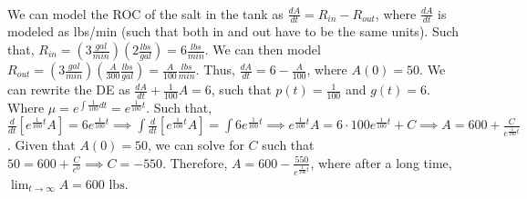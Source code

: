 \documentclass{article}
\begin{document}
\sol \\
We can model the ROC of the salt in the tank as $\frac{dA}{dt} = R_{in} - R_{out}$,
where $\frac{dA}{dt}$ is modeled as lbs/min (such that both in and out have to be the same units).
Such that, $R_{in} = (3 \frac{gal}{min})(2 \frac{lbs}{gal}) = 6 \frac{lbs}{min}$.
We can then model $R_{out} = (3 \frac{gal}{min})(\frac{A}{300} \frac{lbs}{gal}) = \frac{A}{100} \frac{lbs}{min}$.
Thus, $\frac{dA}{dt} = 6 - \frac{A}{100}$, where $A(0) = 50$.
We can rewrite the DE as $\frac{dA}{dt} + \frac{1}{100}A = 6$, such that $p(t) = \frac{1}{100}$ and $g(t) = 6$.
Where $\mu = e^{\int \frac{1}{100} dt} = e^{\frac{1}{100}t}$.
Such that, $\frac{d}{dt} [e^{\frac{1}{100}t}A] = 6e^{\frac{1}{100}t} \implies \int \frac{d}{dt} [e^{\frac{1}{100}t}A] = \int 6e^{\frac{1}{100}t}
\implies e^{\frac{1}{100}t} A = 6 \cdot 100 e^{\frac{1}{100}t} + C \implies A = 600 + \frac{C}{e^{\frac{1}{100}t}}$.
Given that $A(0) = 50$, we can solve for $C$ such that $50 = 600 + \frac{C}{e^0} \implies C = -550$.
Therefore, $A=600-\frac{550}{e^{\frac{1}{100}t}}$, where after a long time, $\lim_{t \to \infty} A = \boxed{600 \text{ lbs}}$.
\end{document}

